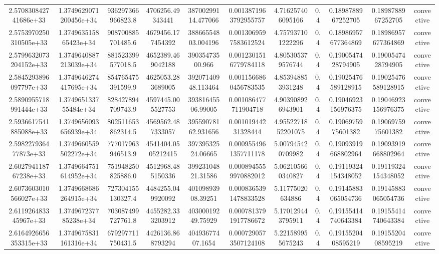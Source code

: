 \begin{table}
\begin{tabular}{ccccccccccc}
2.570830842741686e+33 & 1.3749629071200456e+34 & 936297366966823.8 & 4706256.49343441 & 38700299114.477066 & 0.0013871963792955757 & 4.716257406095166 & 0.4 & 0.1898788967252705 & 0.1898788967252705 & convective \\
2.5753970250310505e+33 & 1.374963515865423e+34 & 908700885701485.6 & 4679456.177454392 & 38866554803.004196 & 0.0013069597583612524 & 4.757937101222296 & 0.4 & 0.18986957677364869 & 0.18986957677364869 & convective \\
2.5799632073204152e+33 & 1.3749640887213039e+34 & 881523399577018.5 & 4652389.469042188 & 39035473500.966 & 0.0012301516779784118 & 4.805305379576744 & 0.4 & 0.1900547428794905 & 0.1900547428794905 & convective \\
2.5845293896097797e+33 & 1.3749646274417695e+34 & 854765475391599.9 & 4625053.283689005 & 39207140948.113464 & 0.0011566860456783535 & 4.853948853931248 & 0.4 & 0.19025476589128915 & 0.19025476589128915 & convective \\
2.5890955718991444e+33 & 1.374965133755484e+34 & 828427894709743.9 & 4597445.005527753 & 39381645506.99005 & 0.001086477711904718 & 4.903908926943901 & 0.4 & 0.19046923156976375 & 0.19046923156976375 & convective \\
2.5936617541885088e+33 & 1.3749656093656939e+34 & 802511653862314.5 & 4569562.487333057 & 39559078162.931656 & 0.00101944231328444 & 4.9552271852201075 & 0.4 & 0.1906975975601382 & 0.1906975975601382 & convective \\
2.598227936477873e+33 & 1.3749660559502272e+34 & 777017963946513.9 & 4541404.0505212415 & 39739532524.06665 & 0.0009554961357711178 & 5.007945420709982 & 0.4 & 0.19093919668802964 & 0.19093919668802964 & convective \\
2.602794118767238e+33 & 1.3749664751614952e+34 & 751948250825886.0 & 4512968.485150336 & 39923104821.31586 & 0.0008945559970882012 & 5.062105660340827 & 0.4 & 0.19119324154348052 & 0.19119324154348052 & convective \\
2.6073603010566027e+33 & 1.3749668686264915e+34 & 727304155130327.4 & 4484255.049920092 & 40109893908.39251 & 0.0008365391478833528 & 5.11775020634886 & 0.4 & 0.19145883065054736 & 0.19145883065054736 & convective \\
2.611926483345967e+33 & 1.374967237785238e+34 & 703087499727761.8 & 4455282.333203912 & 40300019249.75929 & 0.0007813791917786672 & 5.170129443795911 & 0.4 & 0.19155414740643384 & 0.19155414740643384 & convective \\
2.6164926656353315e+33 & 1.3749675831161316e+34 & 679297711750431.5 & 4426136.868793294 & 40493677407.1654 & 0.0007290573507124108 & 5.221589955675243 & 0.4 & 0.1915520408595219 & 0.1915520408595219 & convective \\

\end{tabular}
\end{table}
